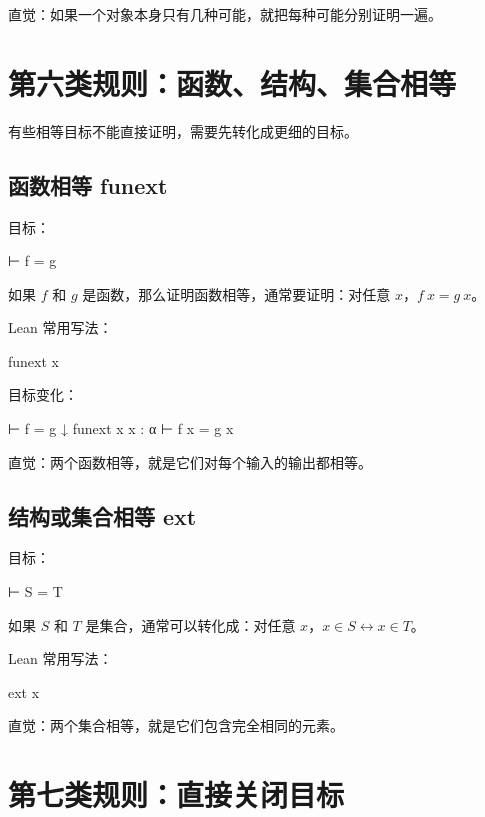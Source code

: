\documentclass[UTF8,12pt]{ctexart}
\begin{document}
直觉：如果一个对象本身只有几种可能，就把每种可能分别证明一遍。

\section{第六类规则：函数、结构、集合相等}

有些相等目标不能直接证明，需要先转化成更细的目标。

\subsection{函数相等 funext}

目标：

\begin{LeanCode}
⊢ f = g
\end{LeanCode}

如果 \(f\) 和 \(g\) 是函数，那么证明函数相等，通常要证明：对任意 \(x\)，\(f\ x = g\ x\)。

Lean 常用写法：

\begin{LeanCode}
funext x
\end{LeanCode}

目标变化：

\begin{Tree}
⊢ f = g
↓ funext x
x : α
⊢ f x = g x
\end{Tree}

直觉：两个函数相等，就是它们对每个输入的输出都相等。

\subsection{结构或集合相等 ext}

目标：

\begin{LeanCode}
⊢ S = T
\end{LeanCode}

如果 \(S\) 和 \(T\) 是集合，通常可以转化成：对任意 \(x\)，\(x \in S \leftrightarrow x \in T\)。

Lean 常用写法：

\begin{LeanCode}
ext x
\end{LeanCode}

直觉：两个集合相等，就是它们包含完全相同的元素。

\section{第七类规则：直接关闭目标}
\end{document}
